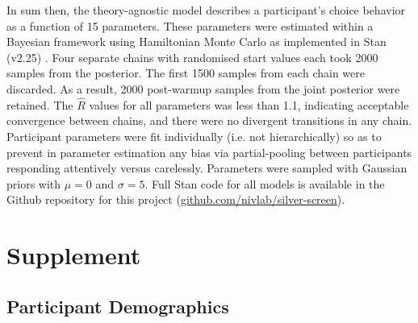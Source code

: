 \documentclass[a4paper,notitlepage,12pt]{article}
\begin{document}
In sum then, the theory-agnostic model describes a participant's choice behavior as a function of 15 parameters. These parameters were estimated within a Bayesian framework using Hamiltonian Monte Carlo as implemented in Stan (v2.25) \cite{stan}. Four separate chains with randomised start values each took 2000 samples from the posterior. The first 1500 samples from each chain were discarded. As a result, 2000 post-warmup samples from the joint posterior were retained. The $\hat{R}$ values for all parameters was less than 1.1, indicating acceptable convergence between chains, and there were no divergent transitions in any chain. Participant parameters were fit individually (i.e. not hierarchically) so as to prevent in parameter estimation any bias via partial-pooling between participants responding attentively versus carelessly. Parameters were sampled with Gaussian priors with $\mu = 0$ and $\sigma = 5$. Full Stan code for all models is available in the Github repository for this project (\url{github.com/nivlab/silver-screen}).

\printbibliography

\pagebreak
\section{Supplement}
\setcounter{table}{0}
\renewcommand{\thetable}{S\arabic{table}}

\subsection{Participant Demographics}
\end{document}
